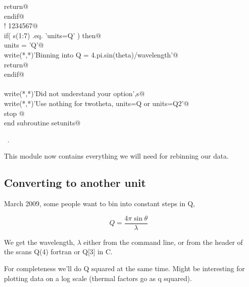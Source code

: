 \documentclass[10pt,a4paper,notitlepage]{article}
\begin{document}
\begin{flushleft}
\begin{minipage}{\linewidth}
\begin{list}{}{}
\mbox{}\verb@          return@\\
\mbox{}\verb@      endif@\\
\mbox{}\verb@!                      1234567@\\
\mbox{}\verb@      if( s(1:7) .eq. 'units=Q' ) then@\\
\mbox{}\verb@          units = 'Q'@\\
\mbox{}\verb@          write(*,*)'Binning into Q = 4.pi.sin(theta)/wavelength'@\\
\mbox{}\verb@          return@\\
\mbox{}\verb@      endif@\\
\mbox{}\verb@@\\
\mbox{}\verb@      write(*,*)'Did not understand your option',s@\\
\mbox{}\verb@      write(*,*)'Use nothing for twotheta, units=Q or units=Q2'@\\
\mbox{}\verb@      stop @\\
\mbox{}\verb@      end subroutine setunits@\\
\mbox{}\verb@@{\NWsep}
\end{list}
\vspace{-1.5ex}
\footnotesize
\begin{list}{}{\setlength{\itemsep}{-\parsep}\setlength{\itemindent}{-\leftmargin}}
\item \NWtxtMacroRefIn\ .

\item{}
\end{list}
\end{minipage}\vspace{4ex}
\end{flushleft}
This module now contains everything we will need for rebinning our data.

\subsection{Converting to another unit }

March 2009, some people want to bin into constant steps in Q, 

 \[ Q = \frac{4\pi \sin{\theta} }{\lambda}  \]

We get the wavelength, $\lambda$ either from the command line,
or from the header of the scans Q(4) fortran or Q[3] in C. 

For completeness we'll do Q squared at the same time. Might be interesting
for plotting data on a log scale (thermal factors go as q squared).
\end{document}
